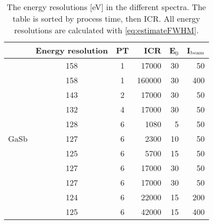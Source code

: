 \begin{table}[htbp]
    \begin{center}
        \caption{
            The energy resolutions [eV] in the different spectra.
            The table is sorted by process time, then ICR.
            All energy resolutions are calculated with \cref{eq:estimateFWHM}.
        }
        \label{tab:results:energy_resolutions}
        \begin{tabular}	{p{1.5cm}ccrrr}
            \hline
            \textbf{		} & \textbf{	Energy resolution	} & \textbf{	PT	} & \textbf{	ICR	} & \textbf{	E$_0$	} & \textbf{	I$_\textnormal{beam}$	} \\
            \hline
                        & 158                          & 1             & 17000          & 30               & 50                               \\
                        & 158                          & 1             & 160000         & 30               & 400                              \\
                        & 143                          & 2             & 17000          & 30               & 50                               \\
                        & 132                          & 4             & 17000          & 30               & 50                               \\
                        & 128                          & 6             & 1080           & 5                & 50                               \\
            GaSb        & 127                          & 6             & 2300           & 10               & 50                               \\
                        & 125                          & 6             & 5700           & 15               & 50                               \\
                        & 127                          & 6             & 17000          & 30               & 50                               \\
                        & 127                          & 6             & 17000          & 30               & 50                               \\
                        & 124                          & 6             & 22000          & 15               & 200                              \\
                        & 125                          & 6             & 42000          & 15               & 400                              \\

\end{tabular}
\end{center}
\end{table}
